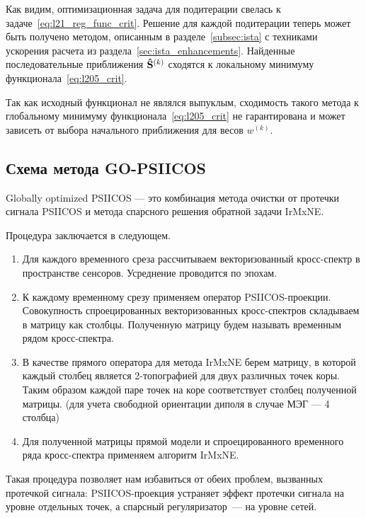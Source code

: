 Как видим, оптимизационная задача для подитерации свелась к
задаче~\ref{eq:l21_reg_func_crit}.  Решение для каждой подитерации теперь может
быть получено методом, описанным в разделе~\ref{subsec:ista} с техниками
ускорения расчета из раздела~\ref{sec:ista_enhancements}.  Найденные
последовательные приближения $\mathbf{\hat{S}}^{(k)}$ сходятся к локальному
минимуму функционала~\ref{eq:l205_crit}.

Так как исходный функционал не являлся выпуклым, сходимость такого метода к глобальному минимуму
функционала~\ref{eq:l205_crit} не гарантирована и может зависеть от выбора начального приближения
для весов $w^{(k)}$.

\subsection{Схема метода GO-PSIICOS}
Globally optimized PSIICOS --- это комбинация метода очистки от
протечки сигнала PSIICOS и метода спарсного решения обратной задачи
IrMxNE.\@

Процедура заключается в следующем.

\begin{enumerate}
    \item Для каждого временного среза рассчитываем векторизованный кросс-спектр 
        в пространстве сенсоров. Усреднение проводится по эпохам.
    \item К каждому временному срезу применяем оператор PSIICOS-проекции. Совокупность 
        спроецированных векторизованных кросс-спектров складываем в матрицу как столбцы. 
        Полученную матрицу будем называть временным рядом кросс-спектра.
    \item В качестве прямого оператора для метода IrMxNE берем матрицу, в которой
        каждый столбец является 2-топографией для двух различных точек коры. Таким
        образом каждой паре точек на коре соответствует столбец полученной матрицы. 
        (для учета свободной ориентации диполя в случае МЭГ --- 4 столбца)
    \item Для полученной матрицы прямой модели и спроецированного
        временного ряда кросс-спектра применяем алгоритм IrMxNE.\@
\end{enumerate}

Такая процедура позволяет нам избавиться от обеих проблем, вызванных протечкой
сигнала: PSIICOS-проекция устраняет эффект протечки сигнала на уровне отдельных
точек, а спарсный регуляризатор~--- на уровне сетей.
